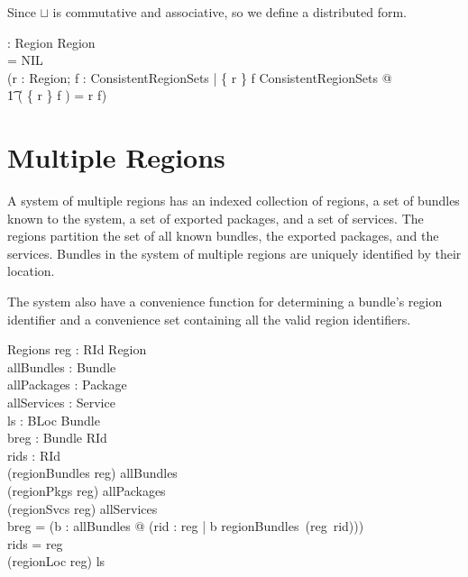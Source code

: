 \documentclass[a4paper,9pt]{article}
\begin{document}
Since $\sqcup$ is commutative and associative, so we define a distributed form.
\begin{axdef}
  \bigsqcup : \finset Region \pfun Region \\
\where
  \bigsqcup \emptyset = NIL \land \\
  (\forall r : Region; f : ConsistentRegionSets | \{ r \} \cup f \in ConsistentRegionSets @ \\
\t1 \bigsqcup( \{ r \} \cup f ) = r \sqcup \bigsqcup f) \\ 
\end{axdef}
  
\clearpage
\section{Multiple Regions}
\label{cha:multiregions}

A system of multiple regions has an indexed collection of regions, a set of bundles known to the
system, a set of exported packages, and a set of services.
The regions partition the set of all known bundles, the exported packages, and the services.
Bundles in the system of multiple regions are uniquely identified by their location.

The system also have a convenience function for determining a bundle's region identifier
and a convenience set containing all the valid region identifiers.
\begin{schema}{Regions}
  reg : RId \pfun Region \\
  allBundles : \power Bundle \\
  allPackages : \power Package \\
  allServices : \power Service \\
  ls : BLoc \pinj Bundle \\
  breg : Bundle \pfun RId \\
  rids : \power RId \\
\where
 (regionBundles \circ reg) \partition allBundles \\
 (regionPkgs \circ reg) \partition allPackages \\
 (regionSvcs \circ reg) \partition allServices \\
 breg = (\lambda b : allBundles @ (\mu rid : \dom reg | b \in regionBundles~(reg~rid))) \\
 rids = \dom reg \\
 (regionLoc \circ reg) \partition ls \\
\end{schema}
\end{document}
